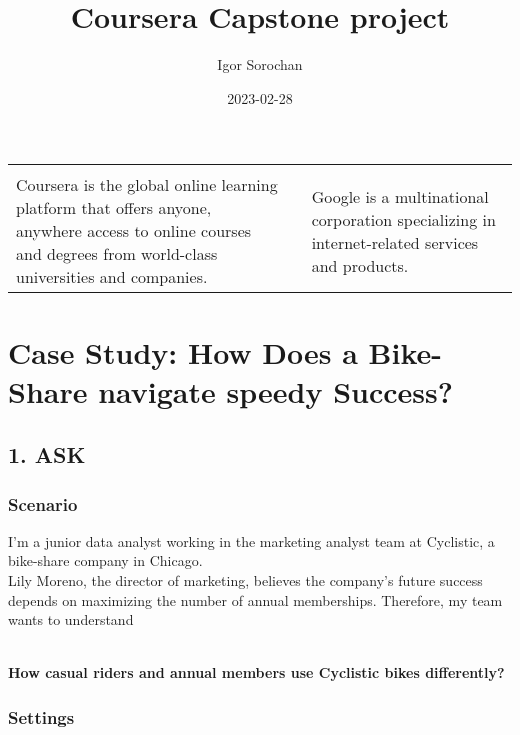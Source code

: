 \documentclass[
]{article}
\title{Coursera Capstone project}
\author{Igor Sorochan}
\date{2023-02-28}
\begin{document}
\maketitle

{
\setcounter{tocdepth}{4}
\tableofcontents
}
\begin{longtable}[]{@{}
  >{\raggedright\arraybackslash}p{}
  >{\raggedright\arraybackslash}p{}
  >{\raggedright\arraybackslash}p{}@{}}
\toprule()
\endhead
& & \\
Coursera is the global online learning platform that offers anyone,
anywhere access to online courses and degrees from world-class
universities and companies. & & Google is a multinational corporation
specializing in internet-related services and products. \\
\bottomrule()
\end{longtable}

\hypertarget{case-study-how-does-a-bike-share-navigate-speedy-success}{%
\section{Case Study: How Does a Bike-Share navigate speedy
Success?}\label{case-study-how-does-a-bike-share-navigate-speedy-success}}

\hypertarget{ask}{%
\subsection{1. ASK}\label{ask}}

\hypertarget{scenario}{%
\subsubsection{Scenario}\label{scenario}}

I'm a junior data analyst working in the marketing analyst team at
Cyclistic, a bike-share company in Chicago.\\

Lily Moreno, the director of marketing, believes the company's future
success depends on maximizing the number of annual memberships.
Therefore, my team wants to understand\\
\strut \\
\textbf{How casual riders and annual members use Cyclistic bikes
differently?}\\

\hypertarget{settings}{%
\subsubsection{Settings}\label{settings}}
\end{document}
